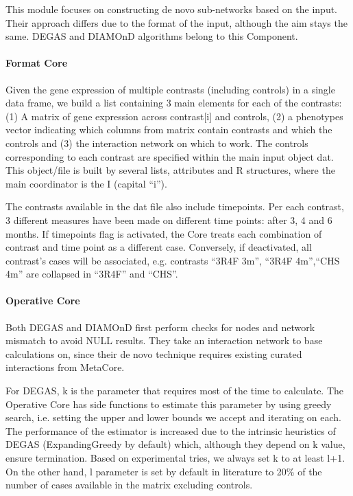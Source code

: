 This module focuses on constructing de novo sub-networks based on the input. Their approach differs due to the format of the input, although the aim stays the same. DEGAS and DIAMOnD algorithms belong to this Component.

\paragraph{Format Core}
Given the gene expression of multiple contrasts (including controls) in a single data frame, we build a list containing 3 main elements for each of the contrasts: (1) A matrix of gene expression across contrast[i] and controls, (2) a phenotypes vector indicating which columns from matrix contain contrasts and which the controls and (3) the interaction network on which to work.
The controls corresponding to each contrast are specified within the main input object dat. This object/file is built by several lists, attributes and R structures, where the main coordinator is the I (capital “i”).

The contrasts available in the dat file also include timepoints. Per each contrast, 3 different measures have been made on different time points: after 3, 4 and 6 months. If timepoints flag is activated, the Core treats each combination of contrast and time point as a different case. Conversely, if deactivated, all contrast’s cases will be associated, e.g. contrasts “3R4F 3m”, “3R4F 4m”,“CHS 4m” are collapsed in “3R4F” and “CHS”.

\paragraph{Operative Core}
Both DEGAS and DIAMOnD first perform checks for nodes and network mismatch to avoid NULL results. They take an interaction network to base calculations on, since their de novo technique requires existing curated interactions from MetaCore.

For DEGAS, k is the parameter that requires most of the time to calculate. The Operative Core has side functions to estimate this parameter by using greedy search, i.e. setting the upper and lower bounds we accept and iterating on each. The performance of the estimator is increased due to the intrinsic heuristics of DEGAS (ExpandingGreedy by default) which, although they depend on k value, ensure termination. Based on experimental tries, we always set k to at least l+1. 
On the other hand, l parameter is set by default in literature to 20\% of the number of cases available in the matrix excluding controls.

